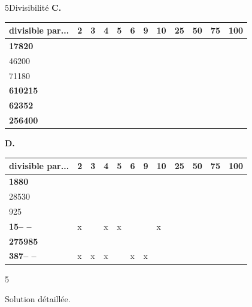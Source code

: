 \begin{exercice}{5}{Divisibilité}
\textbf{C.}
\bigskip

\begin{tabular}{|l|l|l|l|l|l|l|l|l|l|l|l|} 
\hline
\textbf{divisible par...} & \textbf{2} \; \; & \textbf{3} \; \; & \textbf{4} \; \; & \textbf{5}  \; \;& \textbf{6}  \; \;&  \textbf{9}  \; \;&  \textbf{10} \; \; &  \textbf{25} \; \; &  \textbf{50} \; \; &  \textbf{75} \; \; &  \textbf{100}  \\ 
\hline
\textbf{17820}            &           &           &          &           &  &  &   &    &    &    &      \\ 
\hline
46200                     &           &           &           &           &  &   &   &   &   &    &     \\ 
\hline
71180                     &           &            &           &           &   &   &   &    &    &    &      \\ 
\hline
\textbf{610215}           &            &           &            &           &   &   &    &    &    &    &      \\ 
\hline
\textbf{62352}            &           &          &           &            &  &  &    &    &    &    &      \\ 
\hline
\textbf{256400}           &           &            &           &           &   &   &   &   &   &    &     \\
\hline
\end{tabular}
\bigskip

\textbf{D.}
\bigskip

\begin{tabular}{|l|l|l|l|l|l|l|l|l|l|l|l|} 
\hline
\textbf{divisible par...} & \textbf{2} \; \; & \textbf{3} \; \; & \textbf{4} \; \; & \textbf{5}  \; \;& \textbf{6}  \; \;&  \textbf{9}  \; \;&  \textbf{10} \; \; &  \textbf{25} \; \; &  \textbf{50} \; \; &  \textbf{75} \; \; &  \textbf{100}  \\ \hline
\textbf{1880}            &           &          &           &           &  &  &   &    &    &    &      \\ 
\hline
28530                     &           &           &           &           &  &   &   &   &  &    &     \\ 
\hline
925                     &           &            &           &           &   &   &   &    &    &    &      \\ 
\hline
\textbf{15--  --}           & x           &           & x           & x          &   &   & x   &    &    &    &      \\ 
\hline
\textbf{275985}            &           &           &           &            &  &  &    &    &    &    &      \\ 
\hline
\textbf{387--   --}           & x          & x           & x         &           &x  &  x &   &   &   &    &     \\
\hline
\end{tabular}

\end{exercice}
\begin{solution}{5}

Solution détaillée.

\end{solution}

